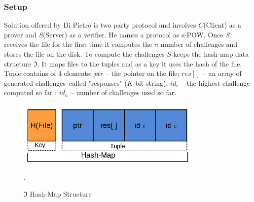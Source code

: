 \documentclass[12pt]{article}
\begin{document}
\subsubsection{Setup}
\label{subsub:setup2}


Solution offered by Di Pietro is two party protocol and involves $C$(Client) as a prover and $S$(Server) as a verifier. He names a protocol as s-POW. Once $S$ receives the file for the first time it computes the $n$ number of challenges and stores the file on the disk. To compute the challenges $S$ keeps the hash-map data structure $\Im$. It maps files to the tuples and as a key it uses the hash of the file. Tuple contains of 4 elements: $ptr$ -- the pointer on the file; $res []$ -- an array of generated challenges--called "responses" ($K$ bit string); $id_c$ -- the highest challenge computed so far ; $id_u$ -- number of challenges used so far.

\begin{figure}[ht] 
\begin{center}
\includegraphics[width=0.8\textwidth]{Di_Pietro_Hash_Map}
\caption{$\Im$ Hash-Map Structure}
\label{fig:Di_Pietro_Hash_Map} .
\end{center}
\end{figure}
\end{document}
